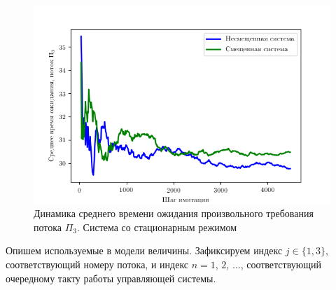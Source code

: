 \begin{figure}[t]
\centering
\includegraphics[scale=1]{Pictures/pic_secondTimeUntilServ_stationar.png} 
\caption{Динамика среднего времени ожидания произвольного требования потока $\Pi_3$. Система со стационарным режимом}
\label{Experiment:timeUntilServiceSecond:stationar}
\end{figure}
Опишем используемые в модели величины.
Зафиксируем индекс $j\in \{1, 3\}$, соответствующий номеру потока, и индекс $n=1$, $2$, $\ldots$, соответствующий очередному такту работы управляющей системы.


